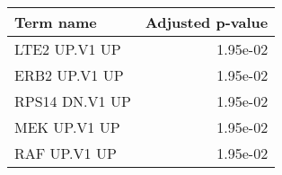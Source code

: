 \begin{tabular}{lr}
\toprule
     Term name &  Adjusted p-value \\
\midrule
 LTE2 UP.V1 UP &          1.95e-02 \\
 ERB2 UP.V1 UP &          1.95e-02 \\
RPS14 DN.V1 UP &          1.95e-02 \\
  MEK UP.V1 UP &          1.95e-02 \\
  RAF UP.V1 UP &          1.95e-02 \\
\bottomrule
\end{tabular}
